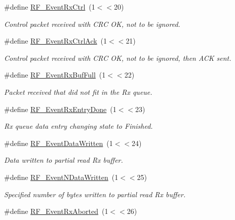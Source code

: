 \begin{DoxyCompactItemize}
\#define \hyperlink{group___r_f___core___events_gafee6f48a825ba7e030ece03eb242e6c2}{R\+F\+\_\+\+Event\+Rx\+Ctrl}~(1$<$$<$20)
\begin{DoxyCompactList}\small\item\em Control packet received with C\+R\+C O\+K, not to be ignored. \end{DoxyCompactList}\item 
\#define \hyperlink{group___r_f___core___events_ga3c29608b6caa9e380407ee0b3df371b8}{R\+F\+\_\+\+Event\+Rx\+Ctrl\+Ack}~(1$<$$<$21)
\begin{DoxyCompactList}\small\item\em Control packet received with C\+R\+C O\+K, not to be ignored, then A\+C\+K sent. \end{DoxyCompactList}\item 
\#define \hyperlink{group___r_f___core___events_ga8ddaa54ac8e8721e7e1cee7f0c07c3c1}{R\+F\+\_\+\+Event\+Rx\+Buf\+Full}~(1$<$$<$22)
\begin{DoxyCompactList}\small\item\em Packet received that did not fit in the Rx queue. \end{DoxyCompactList}\item 
\#define \hyperlink{group___r_f___core___events_ga7051110a4a1fdd459866195be774a2b0}{R\+F\+\_\+\+Event\+Rx\+Entry\+Done}~(1$<$$<$23)
\begin{DoxyCompactList}\small\item\em Rx queue data entry changing state to Finished. \end{DoxyCompactList}\item 
\#define \hyperlink{group___r_f___core___events_ga8ac187c129b68b4311898a5464aa87e5}{R\+F\+\_\+\+Event\+Data\+Written}~(1$<$$<$24)
\begin{DoxyCompactList}\small\item\em Data written to partial read Rx buffer. \end{DoxyCompactList}\item 
\#define \hyperlink{group___r_f___core___events_gaa9c1eb19ce791f4f9c4b917e10fbabdd}{R\+F\+\_\+\+Event\+N\+Data\+Written}~(1$<$$<$25)
\begin{DoxyCompactList}\small\item\em Specified number of bytes written to partial read Rx buffer. \end{DoxyCompactList}\item 
\#define \hyperlink{group___r_f___core___events_gaf2db331d93e28cdafc4367497a2f6f89}{R\+F\+\_\+\+Event\+Rx\+Aborted}~(1$<$$<$26)
$$
\end{DoxyCompactItemize}
